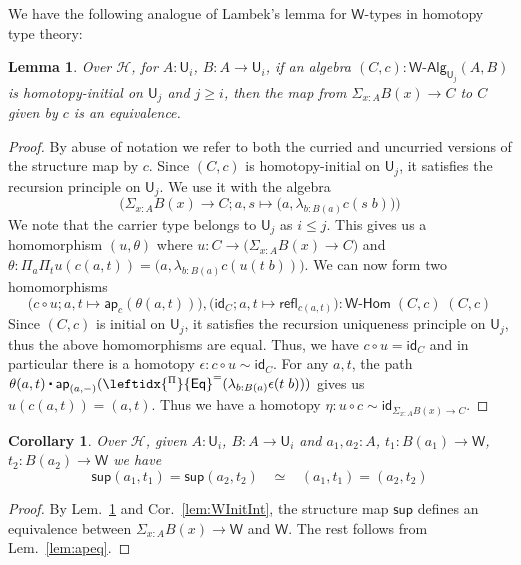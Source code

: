 \documentclass[reqno,10pt,a4paper,oneside]{amsart}
\numberwithin{equation}{section}
\theoremstyle{mythm}
\newtheorem{lemma}[theorem]{Lemma}
\newtheorem{corollary}[theorem]{Corollary}
\theoremstyle{mydef}
\theoremstyle{myrmk}
\newcommand{\idfun}[1]{\mathsf{id}_{#1}}
\newcommand{\comp}{\circ}
\newcommand{\Hint}{\mathcal{H}}
\newcommand{\ct}{%
  \mathchoice{\mathbin{\raisebox{0.5ex}{$\displaystyle\centerdot$}}}%
             {\mathbin{\raisebox{0.5ex}{$\centerdot$}}}%
             {\mathbin{\raisebox{0.25ex}{$\scriptstyle\,\centerdot\,$}}}%
             {\mathbin{\raisebox{0.1ex}{$\scriptscriptstyle\,\centerdot\,$}}}}
\newcommand{\funext}{\leftidx{^\Pi}{\mathsf{Eq}}^{=}}
\newcommand{\prd}[1]{\Pi_{#1}}
\newcommand{\sm}[1]{\Sigma_{#1}}
\newcommand{\lam}[1]{\lambda_{#1}}
\newcommand{\app}{\mathsf{ap}}
\newcommand{\refl}{\mathsf{refl}}
\newcommand{\W}{\mathsf{W}}
\newcommand{\wsup}{\mathsf{sup}}
\newcommand{\UU}{\mathsf{U}}
\newcommand{\WAlg}{\mathsf{W}\text{-}\mathsf{Alg}}
\newcommand{\WHom}{\mathsf{W}\text{-}\mathsf{Hom}}
\begin{document}
We have the following analogue of Lambek's lemma for $\W$-types in homotopy type theory:
\begin{lemma}\label{lem:IntLambek}
Over $\Hint$, for $A:\UU_i$, $B : A \to \UU_i$, if an algebra $(C,c) : \WAlg_{\UU_j}(A,B)$ is homotopy-initial on $\UU_j$ and $j \geq i$, then the map from $\sm{x:A} B(x) \to C$ to $C$ given by $c$ is an equivalence.
\end{lemma}
\begin{proof}
By abuse of notation we refer to both the curried and uncurried versions of the structure map by $c$. Since $(C,c)$ is homotopy-initial on $\UU_j$, it satisfies the recursion principle on $\UU_j$. We use it with the algebra \[\Big(\sm{x:A} B(x) \to C; a,s \mapsto \big(a,\lam{b:B(a)} c(s\;b)\big)\Big)\]
We note that the carrier type belongs to $\UU_j$ as $i \leq j$. This gives us a homomorphism $(u,\theta)$ where $u : C \to \big(\sm{x:A} B(x) \to C\big)$ and $\theta : \prd{a}\prd{t} u(c(a,t)) = \big(a,\lam{b:B(a)} c(u(t\;b))\big)$.  We can now form two homomorphisms
\[\big(c \comp u; a,t \mapsto \app_c(\theta(a,t))\big), \big(\idfun{C}; a,t \mapsto \refl_{c(a,t)}\big) : \WHom \; (C,c) \; (C,c)\]
Since $(C,c)$ is initial on $\UU_j$, it satisfies the recursion uniqueness principle on $\UU_j$, thus the above homomorphisms are equal. Thus, we have $c \comp u = \idfun{C}$ and in particular there is a homotopy $\epsilon : c \comp u \sim \idfun{C}$. For any $a,t$, the path $\theta(a,t) \ct \app_{(a,-)}(\funext(\lam{b:B(a)} \epsilon(t\;b)))$ gives us $u(c(a,t)) = (a,t)$. Thus we have a homotopy $\eta : u \comp c \sim \idfun{\sm{x:A} B(x) \to C}$.
\end{proof}

\begin{corollary}\label{lem:suppath}
Over $\Hint$, given $A:\UU_i$, $B : A \to \UU_i$ and $a_1,a_2:A$, $t_1 : B(a_1) \to \W$, $t_2 : B(a_2) \to \W$ we have
\[ \wsup(a_1,t_1) = \wsup(a_2,t_2) \;\;\; \simeq \;\;\; (a_1,t_1) = (a_2,t_2)\]
\end{corollary}
\begin{proof}
By Lem.~\ref{lem:IntLambek} and Cor.~\ref{lem:WInitInt}, the structure map $\wsup$ defines an equivalence between $\sm{x:A} B(x) \to \W$ and $\W$. The rest follows from Lem.~\ref{lem:apeq}.
\end{proof}
\end{document}
